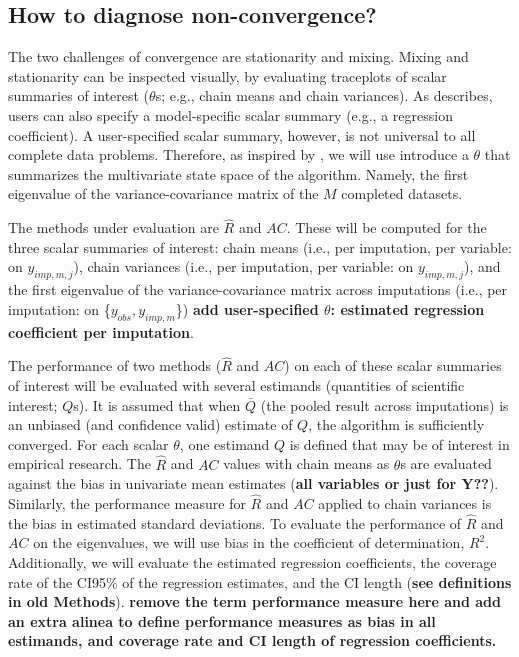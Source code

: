 \documentclass[Royal,times,sageh]{sagej}
\begin{document}
\hypertarget{how-to-diagnose-non-convergence}{%
\subsection{How to diagnose
non-convergence?}\label{how-to-diagnose-non-convergence}}

The two challenges of convergence are stationarity and mixing. Mixing
and stationarity can be inspected visually, by evaluating traceplots of
scalar summaries of interest (\(\theta\)s; e.g., chain means and chain
variances). As \citet{buur18} describes, users can also specify a
model-specific scalar summary (e.g., a regression coefficient). A
user-specified scalar summary, however, is not universal to all complete
data problems. Therefore, as inspired by \citep{mack03}, we will use
introduce a \(\theta\) that summarizes the multivariate state space of
the algorithm. Namely, the first eigenvalue of the variance-covariance
matrix of the \(M\) completed datasets.

The methods under evaluation are \(\widehat{R}\) and \(AC\). These will
be computed for the three scalar summaries of interest: chain means
(i.e., per imputation, per variable: on \(y_{imp, m, j}\)), chain
variances (i.e., per imputation, per variable: on \(y_{imp, m, j}\)),
and the first eigenvalue of the variance-covariance matrix across
imputations (i.e., per imputation: on \{\(y_{obs}, y_{imp, m}\)\})
\textbf{add user-specified \(\theta\): estimated regression coefficient
per imputation}.

The performance of two methods (\(\widehat{R}\) and \(AC\)) on each of
these scalar summaries of interest will be evaluated with several
estimands (quantities of scientific interest; \(Q\)s). It is assumed
that when \(\bar{Q}\) (the pooled result across imputations) is an
unbiased (and confidence valid) estimate of \(Q\), the algorithm is
sufficiently converged. For each scalar \(\theta\), one estimand \(Q\)
is defined that may be of interest in empirical research. The
\(\widehat{R}\) and \(AC\) values with chain means as \(\theta\)s are
evaluated against the bias in univariate mean estimates (\textbf{all
variables or just for Y??}). Similarly, the performance measure for
\(\widehat{R}\) and \(AC\) applied to chain variances is the bias in
estimated standard deviations. To evaluate the performance of
\(\widehat{R}\) and \(AC\) on the eigenvalues, we will use bias in the
coefficient of determination, \(R^2\). Additionally, we will evaluate
the estimated regression coefficients, the coverage rate of the CI95\%
of the regression estimates, and the CI length (\textbf{see definitions
in old Methods}). \textbf{remove the term performance measure here and
add an extra alinea to define performance measures as bias in all
estimands, and coverage rate and CI length of regression coefficients.}
\end{document}
